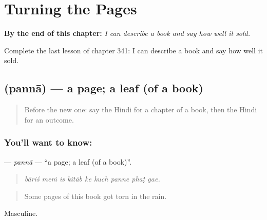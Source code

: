 
\chapter{Turning the Pages}
\label{ch:hi-turning-the-pages}

\begin{chapteropening}
\textbf{By the end of this chapter:} \emph{I can describe a book and say how well it sold.}

Complete the last lesson of chapter 341: I can describe a book and say how well it sold.
\end{chapteropening}

\section[\texorpdfstring{\hi{पन्ना} (pannā)}{पन्ना (pannā)}]{ (pannā) — a page; a leaf (of a book)}

\label{lesson:HI-C341-panna}



\begin{quote}
Before the new one: say the Hindi for a chapter of a book, then the Hindi for an outcome.
\end{quote}

\subsection*{You'll want to know: }
\textbf{} — \emph{pannā} — \textquotedblleft{}a page; a leaf (of a book)\textquotedblright{}.

\begin{quote}
        
\end{quote}

\begin{quote}
\emph{bāriś meṁ is kitāb ke kuch panne phaṭ gae.}
\end{quote}

\begin{quote}
Some pages of this book got torn in the rain.
\end{quote}

Masculine.

